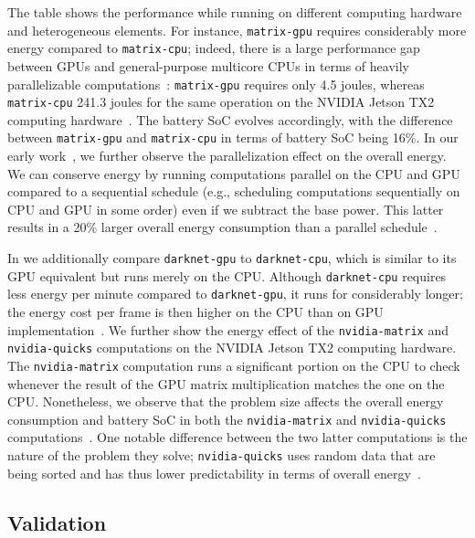The table shows the performance while running on different computing hardware and heterogeneous elements. For instance, {\small\tt matrix-gpu} requires considerably more energy compared to {\small\tt matrix-cpu}; indeed, there is a large performance gap between GPUs and general-purpose multicore CPUs in terms of heavily parallelizable computations~\citep{kirk2016programming}: {\small\tt matrix-gpu} requires only 4.5 joules, whereas {\small\tt matrix-cpu} 241.3 joules for the same operation on the NVIDIA Jetson TX2 computing hardware~\citep{seewald2019coarse}. The battery SoC evolves accordingly, with the difference between {\small\tt matrix-gpu} and {\small\tt matrix-cpu} in terms of battery SoC being 16\%. In our early work~\citep{seewald2019coarse,seewald2019component}, we further observe the parallelization effect on the overall energy. We can conserve energy by running computations parallel on the CPU and GPU compared to a sequential schedule (e.g., scheduling computations sequentially on CPU and GPU in some order) even if we subtract the base power. This latter results in a 20\% larger overall energy consumption than a parallel schedule~\citep{seewald2019coarse}.

In  we additionally compare {\small\tt darknet-gpu} to {\small\tt darknet-cpu}, which is similar to its GPU equivalent but runs merely on the CPU. Although {\small\tt darknet-cpu} requires less energy per minute compared to {\small\tt darknet-gpu}, it runs for considerably longer; the energy cost per frame is then higher on the CPU than on GPU implementation~\citep{seewald2019coarse}. We further show the energy effect of the {\small\tt nvidia-matrix} and {\small\tt nvidia-quicks} computations on the NVIDIA Jetson TX2 computing hardware. The {\small\tt nvidia-matrix} computation runs a significant portion on the CPU to check whenever the result of the GPU matrix multiplication matches the one on the CPU. Nonetheless, we observe that the problem size affects the overall energy consumption and battery SoC in both the {\small\tt nvidia-matrix} and {\small\tt nvidia-quicks} computations~\citep{seewald2019coarse}. One notable difference between the two latter computations is the nature of the problem they solve; {\small\tt nvidia-quicks} uses random data that are being sorted and has thus lower predictability in terms of overall energy~\citep{seewald2019coarse}.

\subsection{Validation}

